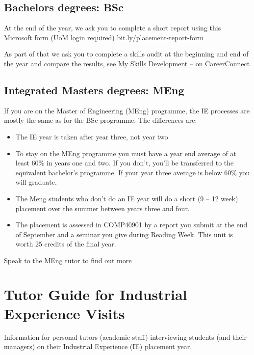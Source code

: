 \documentclass[
]{book}
\providecommand{\tightlist}{%
  \setlength{\itemsep}{0pt}\setlength{\parskip}{0pt}}
\begin{document}
\section{Bachelors degrees: BSc}\label{bsc}

At the end of the year, we ask you to complete a short report using this Microsoft form (UoM login required) \href{https://bit.ly/placement-report-form}{bit.ly/placement-report-form}

As part of that we ask you to complete a skills audit at the beginning and end of the year and compare the results, see \href{https://www.careers.manchester.ac.uk/options/skills/myskills}{My Skills Development -- on CareerConnect} \citep{audit}

\section{Integrated Masters degrees: MEng}\label{meng}

If you are on the Master of Engineering (MEng) programme, the IE processes are mostly the same as for the BSc programme. The differences are:

\begin{itemize}
\tightlist
\item
  The IE year is taken after year three, not year two
\item
  To stay on the MEng programme you must have a year end average of at least 60\% in years one and two. If you don't, you'll be transferred to the equivalent bachelor's programme. If your year three average is below 60\% you will graduate.
\item
  The Meng students who don't do an IE year will do a short (9 -- 12 week) placement over the summer between years three and four.
\item
  The placement is assessed in COMP40901 by a report you submit at the end of September and a seminar you give during Reading Week. This unit is worth 25 credits of the final year.
\end{itemize}

Speak to the MEng tutor to find out more

\chapter{Tutor Guide for Industrial Experience Visits}\label{tutors}

Information for personal tutors (academic staff) interviewing students (and their managers) on their Industrial Experience (IE) placement year.
\end{document}

